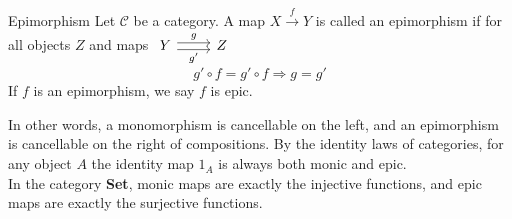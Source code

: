 \begin{definition}{Epimorphism}
  Let $\mathscr{C}$ be a category. A map $X \overset{f}{\to} Y$ is called an epimorphism if for all objects $Z$ and maps
  $
  \begin{tikzcd}
    Y \arrow[r,shift left, "g"] \arrow[r,shift right,swap,"g'"] & Z
  \end{tikzcd}
  $
  \[
    g' \circ f = g' \circ f \Rightarrow g = g'
  \]
  If $f$ is an epimorphism, we say $f$ is epic.
\end{definition}


In other words, a monomorphism is cancellable on the left, and an epimorphism is cancellable on the right of compositions.
By the identity laws of categories, for any object $A$ the identity map $1_A$ is always both monic and epic.\\
In the category \textbf{Set}, monic maps are exactly the injective functions, and epic maps are exactly the surjective functions.
